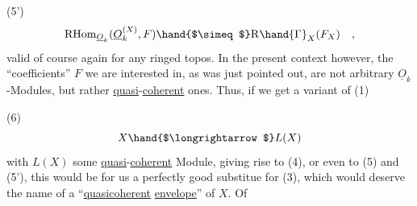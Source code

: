 (5') \[ \mathrm{RHom}_{\underline{O}_k}( \underline{O}_k^{(X)}, F ) \hand{$\simeq$} \mathrm{R}\hand{\Gamma}_X(F_X) \quad , \]
valid of course again for any ringed topos. In the present context
however, the ``coefficients'' $F$ we are interested in, as was just pointed
out, are not arbitrary $\underline{O}_k$-Modules, but rather \uline{quasi}-\uline{coherent} ones.
Thus, if we get a variant of (1)

(6) \[ X \hand{$\longrightarrow$} L(X) \]
with $L(X)$ some \uline{quasi}-\uline{coherent} Module, giving rise to (4), or even to
(5) and (5'), this would be for us a perfectly good substitue for (3),
which would deserve the name of a ``\uline{quasicoherent} \uline{envelope}'' of $X$. Of


